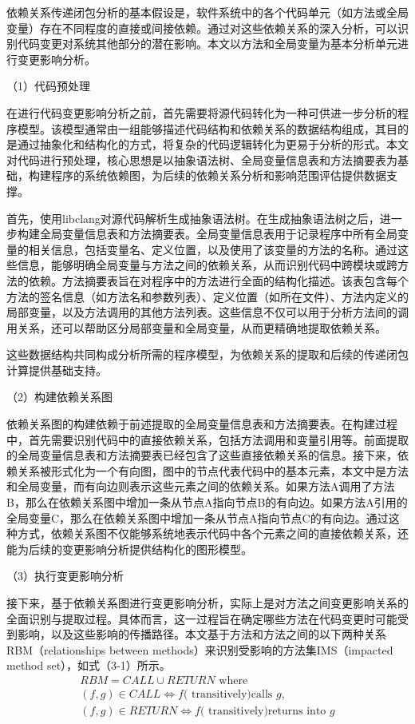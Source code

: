 依赖关系传递闭包分析的基本假设是，软件系统中的各个代码单元（如方法或全局变量）存在不同程度的直接或间接依赖。通过对这些依赖关系的深入分析，可以识别代码变更对系统其他部分的潜在影响。本文以方法和全局变量为基本分析单元进行变更影响分析。

（1）代码预处理

在进行代码变更影响分析之前，首先需要将源代码转化为一种可供进一步分析的程序模型。该模型通常由一组能够描述代码结构和依赖关系的数据结构组成，其目的是通过抽象化和结构化的方式，将复杂的代码逻辑转化为更易于分析的形式。本文对代码进行预处理，核心思想是以抽象语法树、全局变量信息表和方法摘要表为基础，构建程序的系统依赖图，为后续的依赖关系分析和影响范围评估提供数据支撑。

首先，使用libclang对源代码解析生成抽象语法树。在生成抽象语法树之后，进一步构建全局变量信息表和方法摘要表。全局变量信息表用于记录程序中所有全局变量的相关信息，包括变量名、定义位置，以及使用了该变量的方法的名称。通过这些信息，能够明确全局变量与方法之间的依赖关系，从而识别代码中跨模块或跨方法的依赖。方法摘要表旨在对程序中的方法进行全面的结构化描述。该表包含每个方法的签名信息（如方法名和参数列表）、定义位置（如所在文件）、方法内定义的局部变量，以及方法调用的其他方法列表。这些信息不仅可以用于分析方法间的调用关系，还可以帮助区分局部变量和全局变量，从而更精确地提取依赖关系。

这些数据结构共同构成分析所需的程序模型，为依赖关系的提取和后续的传递闭包计算提供基础支持。

（2）构建依赖关系图

依赖关系图的构建依赖于前述提取的全局变量信息表和方法摘要表。在构建过程中，首先需要识别代码中的直接依赖关系，包括方法调用和变量引用等。前面提取的全局变量信息表和方法摘要表已经包含了这些直接依赖关系的信息。接下来，依赖关系被形式化为一个有向图，图中的节点代表代码中的基本元素，本文中是方法和全局变量，而有向边则表示这些元素之间的依赖关系。如果方法A调用了方法B，那么在依赖关系图中增加一条从节点A指向节点B的有向边。如果方法A引用的全局变量C，那么在依赖关系图中增加一条从节点A指向节点C的有向边。通过这种方式，依赖关系图不仅能够系统地表示代码中各个元素之间的直接依赖关系，还能为后续的变更影响分析提供结构化的图形模型。

（3）执行变更影响分析

接下来，基于依赖关系图进行变更影响分析，实际上是对方法之间变更影响关系的全面识别与提取过程。具体而言，这一过程旨在确定哪些方法在代码变更时可能受到影响，以及这些影响的传播路径。本文基于方法和方法之间的以下两种关系RBM（relationships between methods）来识别受影响的方法集IMS（impacted method set），如式（3-1）所示。
\begin{equation}
\begin{array}{l}
R B M=C A L L \cup R E T U R N \text { where } \\
(f, g) \in C A L L \Longleftrightarrow f(\text { transitively)calls } g, \\
(f, g) \in R E T U R N \Longleftrightarrow f(\text { transitively)returns into } g
\end{array}
\end{equation}

